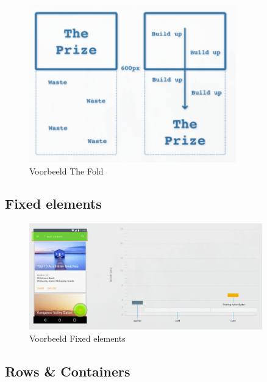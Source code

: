 \documentclass{article}
\begin{document}
\begin{figure}[H]
    \centering
    \includegraphics[width=0.8\textwidth]{img/Screenshot_20200302_085221.png}
    \caption{Voorbeeld The Fold}
\end{figure}

\subsection{Fixed elements}

\begin{figure}[H]
    \centering
    \includegraphics[width=0.9\textwidth]{img/Screenshot_20200302_085450.png}
    \caption{Voorbeeld Fixed elements}
\end{figure}

\subsection{Rows \& Containers}
\end{document}
